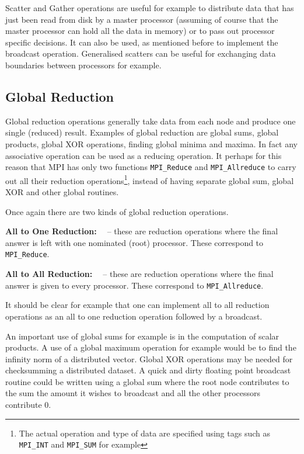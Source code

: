Scatter and Gather operations are useful for example to distribute data
that has just been read from disk by a master processor (assuming of course
that the master processor can hold all the data in memory) or to pass out
processor specific decisions. It can also be used, as mentioned before
to implement the broadcast operation. Generalised scatters can be useful
for exchanging data boundaries between processors for example.

\subsection{Global Reduction}
Global reduction operations generally take data from each node and
produce one single (reduced) result. Examples of global reduction are
global sums, global products, global XOR operations, finding global
minima and maxima. In fact any associative operation can be used as a
reducing operation. It perhaps for this reason that MPI has only two
functions {\tt MPI\_Reduce} and {\tt MPI\_Allreduce} to carry out all
their reduction operations\footnote{The actual operation and type of
data are specified using tags such as {\tt MPI\_INT} and {\tt MPI\_SUM}
for example}, instead of having separate global sum, global XOR and
other global routines.
 
Once again there are two kinds of global reduction operations.
\begin{description}
\item{\bf All to One Reduction: \ } -- these are reduction operations
where the final answer is left with one nominated (root) processor. 
These correspond to {\tt MPI\_Reduce}.
\item{\bf All to All Reduction: \ } -- these are reduction operations
where the final answer is given to every processor. These correspond 
to {\tt MPI\_Allreduce}. 
\end{description}

It should be clear for example that one can implement all to all 
reduction operations as an all to one reduction operation followed 
by a broadcast.

An important use of global sums for example is in the computation
of scalar products. A use of a global maximum operation for example
would be to find the infinity norm of a distributed vector. Global
XOR operations may be needed for checksumming a distributed dataset.
A quick and dirty floating point broadcast routine could be written
using a global sum where the root node contributes to the sum the 
amount it wishes to broadcast and all the other processors contribute
0. 

